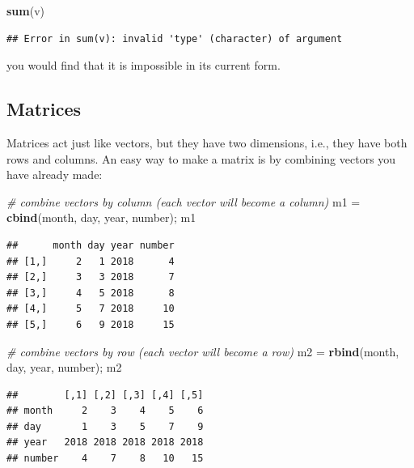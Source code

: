\documentclass[]{book}
\newenvironment{Shaded}{\begin{snugshade}}{\end{snugshade}}
\newcommand{\CommentTok}[1]{\textcolor[rgb]{0.56,0.35,0.01}{\textit{#1}}}
\newcommand{\KeywordTok}[1]{\textcolor[rgb]{0.13,0.29,0.53}{\textbf{#1}}}
\newcommand{\NormalTok}[1]{#1}
\newcommand{\StringTok}[1]{\textcolor[rgb]{0.31,0.60,0.02}{#1}}
\begin{document}
\begin{Shaded}
\begin{Highlighting}[]
\KeywordTok{sum}\NormalTok{(v)}
\end{Highlighting}
\end{Shaded}

\begin{verbatim}
## Error in sum(v): invalid 'type' (character) of argument
\end{verbatim}

you would find that it is impossible in its current form.

\hypertarget{matrices}{%
\subsection{Matrices}\label{matrices}}

Matrices act just like vectors, but they have two dimensions, i.e., they have both rows and columns. An easy way to make a matrix is by combining vectors you have already made:

\begin{Shaded}
\begin{Highlighting}[]
\CommentTok{# combine vectors by column (each vector will become a column)}
\NormalTok{m1 =}\StringTok{ }\KeywordTok{cbind}\NormalTok{(month, day, year, number); m1}
\end{Highlighting}
\end{Shaded}

\begin{verbatim}
##      month day year number
## [1,]     2   1 2018      4
## [2,]     3   3 2018      7
## [3,]     4   5 2018      8
## [4,]     5   7 2018     10
## [5,]     6   9 2018     15
\end{verbatim}

\begin{Shaded}
\begin{Highlighting}[]
\CommentTok{# combine vectors by row (each vector will become a row)}
\NormalTok{m2 =}\StringTok{ }\KeywordTok{rbind}\NormalTok{(month, day, year, number); m2}
\end{Highlighting}
\end{Shaded}

\begin{verbatim}
##        [,1] [,2] [,3] [,4] [,5]
## month     2    3    4    5    6
## day       1    3    5    7    9
## year   2018 2018 2018 2018 2018
## number    4    7    8   10   15
\end{verbatim}
\end{document}
